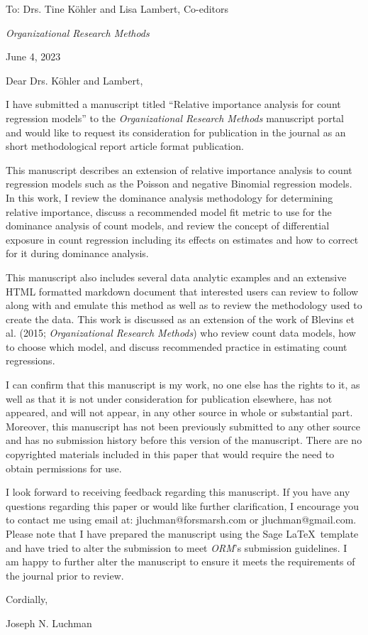 \documentclass[10pt,letterpaper]{letter}
\begin{document}
	
	To: Drs. Tine K{\"o}hler and Lisa Lambert, Co-editors
	
	\emph{Organizational Research Methods}
	
	June 4, 2023
	
	Dear Drs. K{\"o}hler and Lambert,
	
	I have submitted a manuscript titled “Relative importance analysis for count regression models” to the \emph{Organizational Research Methods} manuscript portal and would like to request its consideration for publication in the journal as an short methodological report article format publication.
	
	This manuscript describes an extension of relative importance analysis to count regression models such as the Poisson and negative Binomial regression models. 
	In this work, I review the dominance analysis methodology for determining relative importance, discuss a recommended model fit metric to use for the dominance analysis of count models, and review the concept of differential exposure in count regression including its effects on estimates and how to correct for it during dominance analysis.
	
	This manuscript also includes several data analytic examples and an extensive HTML formatted markdown document that interested users can review to follow along with and emulate this method as well as to review the methodology used to create the data. 
	This work is discussed as an extension of the work of Blevins et al. (2015; \emph{Organizational Research Methods}) who review count data models, how to choose which model, and discuss recommended practice in estimating count regressions. 
	
	I can confirm that this manuscript is my work, no one else has the rights to it, as well as that it is not under consideration for publication elsewhere, has not appeared, and will not appear, in any other source in whole or substantial part. 
	Moreover, this manuscript has not been previously submitted to any other source and has no submission history before this version of the manuscript.  
	There are no copyrighted materials included in this paper that would require the need to obtain permissions for use.
	
	I look forward to receiving feedback regarding this manuscript. 
	If you have any questions regarding this paper or would like further clarification, I encourage you to contact me using email at: jluchman@forsmarsh.com or jluchman@gmail.com. 
	Please note that I have prepared the manuscript using the Sage \LaTeX \ template and have tried to alter the submission to meet \emph{ORM}'s submission guidelines. 
	I am happy to further alter the manuscript to ensure it meets the requirements of the journal prior to review.
	
	Cordially,
	
	Joseph N. Luchman
\end{document}
